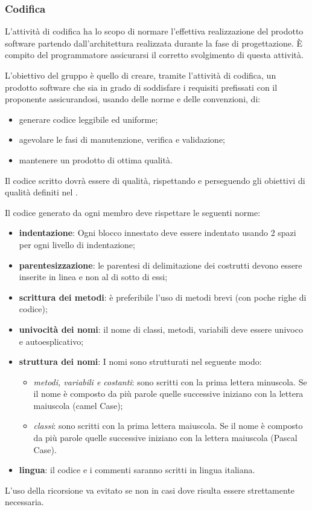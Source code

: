 \subsubsection{Codifica}
L'attività di codifica ha lo scopo di normare l'effettiva realizzazione del prodotto software partendo dall'architettura realizzata durante la fase di progettazione. È compito del programmatore assicurarsi il corretto svolgimento di questa attività.

L'obiettivo del gruppo \Omicron{} è quello di creare, tramite l'attività di codifica, un prodotto software che sia in grado di soddisfare i requisiti prefissati con il proponente assicurandosi, usando delle norme e delle convenzioni, di:
\begin{itemize}
\item generare codice leggibile ed uniforme;
\item agevolare le fasi di manutenzione, verifica e validazione;
\item mantenere un prodotto di ottima qualità. 
\end{itemize}

Il codice scritto dovrà essere di qualità, rispettando e perseguendo gli obiettivi di qualità definiti nel \PdQv.

Il codice generato da ogni membro deve rispettare le seguenti norme:
\begin{itemize}
\item \textbf{indentazione}: Ogni blocco innestato deve essere indentato usando 2 spazi per ogni livello di indentazione;
\item \textbf{parentesizzazione}: le parentesi di delimitazione dei costrutti devono essere inserite in linea e non al di sotto di essi;
\item \textbf{scrittura dei metodi}: è preferibile l'uso di metodi brevi (con poche righe di codice);
\item \textbf{univocità dei nomi}: il nome di classi, metodi, variabili deve essere univoco e autoesplicativo;
\item \textbf{struttura dei nomi}: I nomi sono strutturati nel seguente modo:
\begin{itemize}
\item \textit{metodi, variabili e costanti}: sono scritti con la prima lettera minuscola. Se il nome è composto da più parole quelle successive iniziano con la lettera maiuscola (camel Case);
\item \textit{classi}: sono scritti con la prima lettera maiuscola. Se il nome è composto da più parole quelle successive iniziano con la lettera maiuscola (Pascal Case).
\end{itemize} 
\item \textbf{lingua}: il codice e i commenti saranno scritti in lingua italiana.
\end{itemize}

L'uso della ricorsione va evitato se non in casi dove risulta essere strettamente necessaria.
